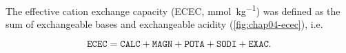 The effective cation exchange capacity (ECEC, \si{\milli\mole\per\kilo\gram}) was defined as the sum of 
exchangeable bases and exchangeable acidity (\autoref{fig:chap04-ecec}), i.e. 

\begin{equation*}
 \texttt{ECEC} = \texttt{CALC} + \texttt{MAGN} + \texttt{POTA} + \texttt{SODI} + \texttt{EXAC}.
\end{equation*}



